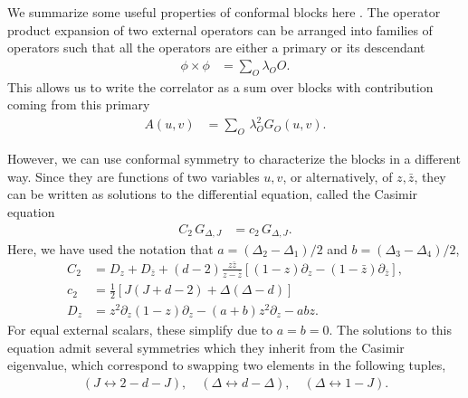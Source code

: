 We summarize some useful properties of conformal blocks here \cite{Dolan:2003hv}.
The operator product expansion of two external operators can be arranged into families of operators such that all the operators are either a primary or its descendant
\begin{align}
  \phi \times \phi & = \sum_{O} \lambda_{O} O
  .\end{align}
This allows us to write the correlator as a sum over blocks with contribution coming from this primary
\begin{align}
  A \left( u,v \right) & = \sum_{O} \, \lambda_{O}^2 G_{O} \left( u,v \right)
  .\end{align}

However, we can use conformal symmetry to characterize the blocks in a different way.
Since they are functions of two variables $ u,v $, or alternatively, of $ z, \bar{z} $, they can be written as solutions to the differential equation, called the Casimir equation
\begin{align}
  C_2 \, G_{\Delta,J} & = c_2 \, G_{\Delta,J}
  .\end{align}
Here, we have used the notation that $ a = \left( \Delta_2 - \Delta_1 \right)/2 $ and $ b = \left( \Delta_3 - \Delta_4 \right)/2 $,
\begin{align}
  \label{eq:CasimirEq}
  C_2   & = D_z  + D_{\bar{z}} + \left( d-2 \right) \frac{z \bar{z}}{z - \bar{z}} \left[ \left( 1-z \right) \partial_{z} - \left( 1 - \bar{z} \right) \partial_{\bar{z}} \right] ,\nonumber \\
  c_2   & = \frac{1}{2} \left[ J\left( J+d-2 \right)+ \Delta\left( \Delta-d \right) \right]\nonumber                                                                                        \\
  D_{z} & = z^2 \partial_z \left( 1-z \right) \partial_z - \left( a+b \right)z^2 \partial_z -  a b z
  .\end{align}
For equal external scalars, these simplify due to $ a = b = 0 $.
The solutions to this equation admit several symmetries which they inherit from the Casimir eigenvalue, which correspond to swapping two elements in the following tuples,
\begin{align}
  \label{eq:swaps}
  \left( J \leftrightarrow 2-d-J \right),
  \quad
  \left( \Delta \leftrightarrow d-\Delta \right),
  \quad
  \left(\Delta  \leftrightarrow 1-J \right)
  .\end{align}

